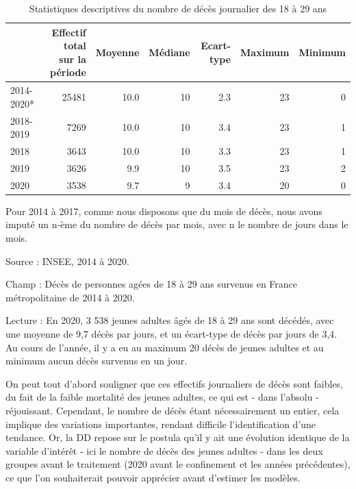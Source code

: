 \documentclass[titlepage]{article}
\begin{document}
\begin{table}[!h]

\caption{\label{tab:Descr}Statistiques descriptives du nombre de décès journalier des 18 à 29 ans}
\centering
\begin{threeparttable}
\begin{tabular}[t]{lrrrrrr}
\toprule
  & Effectif total sur la période & Moyenne & Médiane & Ecart-type & Maximum & Minimum\\
\midrule
2014-2020* & 25481 & 10.0 & 10 & 2.3 & 23 & 0\\
2018-2019 & 7269 & 10.0 & 10 & 3.4 & 23 & 1\\
2018 & 3643 & 10.0 & 10 & 3.3 & 23 & 1\\
2019 & 3626 & 9.9 & 10 & 3.5 & 23 & 2\\
2020 & 3538 & 9.7 & 9 & 3.4 & 20 & 0\\
\bottomrule
\end{tabular}
\begin{tablenotes}
\small
\item *Pour 2014 à 2017, comme nous disposons que du mois de décès, nous avons imputé un n-ème du nombre de décès par mois, avec n le nombre de jours dans le mois.
\item Source : INSEE, 2014 à 2020.
\item Champ : Décès de personnes agées de 18 à 29 ans survenus en France métropolitaine de 2014 à 2020.
\item Lecture : En 2020, 3 538 jeunes adultes âgés de 18 à 29 ans sont décédés, avec une moyenne de 9,7 décès par jours, et un écart-type de décès par jours de 3,4. Au cours de l'année, il y a eu au maximum 20 décès de jeunes adultes et au minimum aucun décès survenus en un jour.
\end{tablenotes}
\end{threeparttable}
\end{table}
On peut tout d'abord souligner que ces effectifs journaliers de décès sont faibles, du fait de la faible mortalité des jeunes adultes, ce qui est - dans l'absolu - réjouissant. Cependant, le nombre de décès étant nécessairement un entier, cela implique des variations importantes, rendant difficile l'identification d'une tendance. Or, la DD repose sur le postula qu'il y ait une évolution identique de la variable d'intérêt - ici le nombre de décès des jeunes adultes - dans les deux groupes avant le traitement (2020 avant le confinement et les années précédentes), ce que l'on souhaiterait pouvoir apprécier avant d'estimer les modèles. \\
\end{document}
